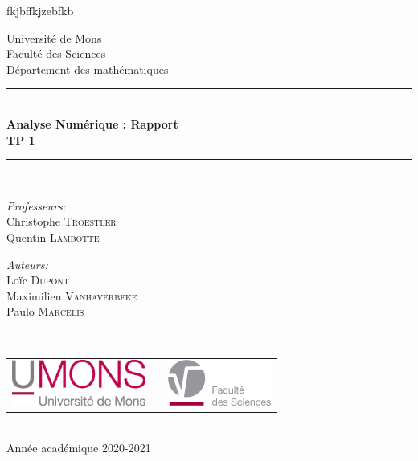 fkjbffkjzebfkb\documentclass[a4paper, 12pt]{article}
\begin{document}
\begin{titlepage}
\begin{center}

{\Large Université de Mons}\\[1ex]
{\Large Faculté des Sciences}\\[1ex]
{\Large Département des mathématiques}\\[2.5cm]

\newcommand{\HRule}{\rule{\linewidth}{0.3mm}}
\HRule \\[0.3cm]
{ \LARGE \bfseries Analyse Numérique : Rapport \\[0.3cm]}
{ \LARGE \bfseries TP 1 \\[0.1cm]}
\HRule \\[1.5cm]

\begin{minipage}[t]{0.45\textwidth}
\begin{flushleft} \large
\emph{Professeurs:}\\
Christophe \textsc{Troestler} \\
Quentin \textsc{Lambotte}
\end{flushleft}
\end{minipage}
\begin{minipage}[t]{0.45\textwidth}
\begin{flushright} \large
\emph{Auteurs:} \\
Loïc \textsc{Dupont} \\
Maximilien \textsc{Vanhaverbeke} \\
Paulo \textsc{Marcelis}
\end{flushright}
\end{minipage}\\[2ex]

\vfill

\begin{center}
\begin{tabular}[t]{c c c}
\includegraphics[height=1.5cm]{logoumons.jpg} &
\hspace{0.3cm} &
\includegraphics[height=1.5cm]{logofs.jpg}
\end{tabular}
\end{center}~\\
 
{\large Année académique 2020-2021}

\end{center}
\end{titlepage}
\end{document}
